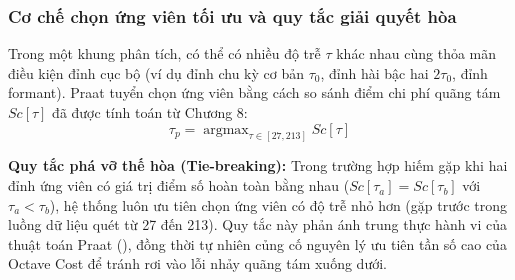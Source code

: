 \subsubsection*{Cơ chế chọn ứng viên tối ưu và quy tắc giải quyết hòa}
Trong một khung phân tích, có thể có nhiều độ trễ $\tau$ khác nhau cùng thỏa mãn điều kiện đỉnh cục bộ (ví dụ đỉnh chu kỳ cơ bản $\tau_0$, đỉnh hài bậc hai $2\tau_0$, đỉnh formant). Praat tuyển chọn ứng viên bằng cách so sánh điểm chi phí quãng tám $Sc[\tau]$ đã được tính toán từ Chương 8:
\begin{equation}
\tau_p = \operatorname{argmax}_{\tau \in [27, 213]} Sc[\tau]
\end{equation}

\textbf{Quy tắc phá vỡ thế hòa (Tie-breaking):} Trong trường hợp hiếm gặp khi hai đỉnh ứng viên có giá trị điểm số hoàn toàn bằng nhau ($Sc[\tau_a] = Sc[\tau_b]$ với $\tau_a < \tau_b$), hệ thống luôn ưu tiên chọn ứng viên có độ trễ nhỏ hơn (gặp trước trong luồng dữ liệu quét từ 27 đến 213). Quy tắc này phản ánh trung thực hành vi của thuật toán Praat (), đồng thời tự nhiên củng cố nguyên lý ưu tiên tần số cao của Octave Cost để tránh rơi vào lỗi nhảy quãng tám xuống dưới.

